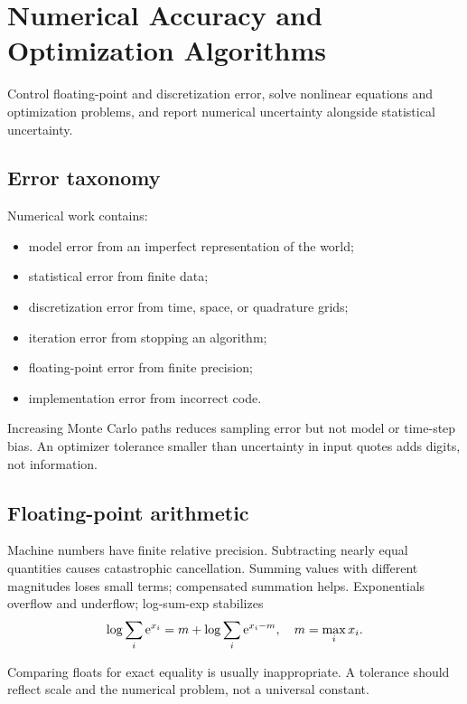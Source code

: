 \chapter{Numerical Accuracy and Optimization Algorithms}

\begin{objectives}
Control floating-point and discretization error, solve nonlinear equations and
optimization problems, and report numerical uncertainty alongside statistical
uncertainty.
\end{objectives}

\section{Error taxonomy}

Numerical work contains:

\begin{itemize}
\item model error from an imperfect representation of the world;
\item statistical error from finite data;
\item discretization error from time, space, or quadrature grids;
\item iteration error from stopping an algorithm;
\item floating-point error from finite precision;
\item implementation error from incorrect code.
\end{itemize}

Increasing Monte Carlo paths reduces sampling error but not model or time-step bias.
An optimizer tolerance smaller than uncertainty in input quotes adds digits, not
information.

\section{Floating-point arithmetic}

Machine numbers have finite relative precision. Subtracting nearly equal quantities
causes catastrophic cancellation. Summing values with different magnitudes loses
small terms; compensated summation helps. Exponentials overflow and underflow;
log-sum-exp stabilizes
\[
\log\sum_i\mathrm e^{x_i}
=m+\log\sum_i\mathrm e^{x_i-m},\quad m=\max_i x_i.
\]

Comparing floats for exact equality is usually inappropriate. A tolerance should
reflect scale and the numerical problem, not a universal constant.

